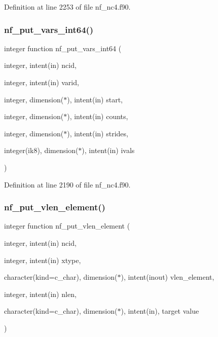 Definition at line 2253 of file nf\+\_\+nc4.\+f90.

\mbox{\label{nf__nc4_8f90_a3753d47abff6fc4d5b56ceed62997265}} 
\subsubsection{\texorpdfstring{nf\+\_\+put\+\_\+vars\+\_\+int64()}{nf\_put\_vars\_int64()}}
{\footnotesize\ttfamily integer function nf\+\_\+put\+\_\+vars\+\_\+int64 (\begin{DoxyParamCaption}\item[{integer, intent(in)}]{ncid,  }\item[{integer, intent(in)}]{varid,  }\item[{integer, dimension($\ast$), intent(in)}]{start,  }\item[{integer, dimension($\ast$), intent(in)}]{counts,  }\item[{integer, dimension($\ast$), intent(in)}]{strides,  }\item[{integer(ik8), dimension($\ast$), intent(in)}]{ivals }\end{DoxyParamCaption})}



Definition at line 2190 of file nf\+\_\+nc4.\+f90.

\mbox{\label{nf__nc4_8f90_a5bc75056dc718cbfbc9232ec8bc4baf1}} 
\subsubsection{\texorpdfstring{nf\+\_\+put\+\_\+vlen\+\_\+element()}{nf\_put\_vlen\_element()}}
{\footnotesize\ttfamily integer function nf\+\_\+put\+\_\+vlen\+\_\+element (\begin{DoxyParamCaption}\item[{integer, intent(in)}]{ncid,  }\item[{integer, intent(in)}]{xtype,  }\item[{character(kind=c\+\_\+char), dimension($\ast$), intent(inout)}]{vlen\+\_\+element,  }\item[{integer, intent(in)}]{nlen,  }\item[{character(kind=c\+\_\+char), dimension($\ast$), intent(in), target}]{value }\end{DoxyParamCaption})}




